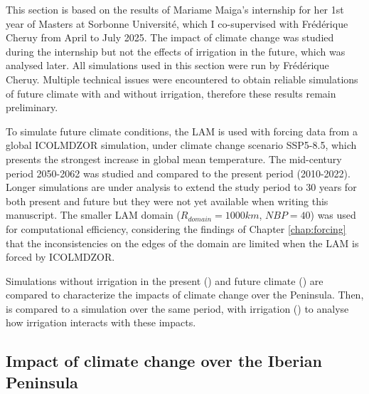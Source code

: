 This section is based on the results of Mariame Maiga's internship for her 1st year of Masters at Sorbonne Université, which I co-supervised with Frédérique Cheruy from April to July 2025. The impact of climate change was studied during the internship but not the effects of irrigation in the future, which was analysed later. All simulations used in this section were run by Frédérique Cheruy. 
Multiple technical issues were encountered to obtain reliable simulations of future climate with and without irrigation, therefore these results remain preliminary.

\hfill

To simulate future climate conditions, the LAM is used with forcing data from a global ICOLMDZOR simulation, under climate change scenario SSP5-8.5, which presents the strongest increase in global mean temperature. The mid-century period 2050-2062 was studied and compared to the present period (2010-2022). Longer simulations are under analysis to extend the study period to 30 years for both present and future but they were not yet available when writing this manuscript.
The smaller LAM domain ($R_{domain} = 1000 km$, $NBP=40$) was used for computational efficiency, considering the findings of Chapter \ref{chap:forcing} that the inconsistencies on the edges of the domain are limited when the LAM is forced by ICOLMDZOR.

Simulations without irrigation in the present (\presnoirr) and future climate (\futnoirr) are compared to characterize the impacts of climate change over the Peninsula. Then, \futnoirr is compared to a simulation over the same period, with irrigation (\futirr) to analyse how irrigation interacts with these impacts.

\subsection{Impact of climate change over the Iberian Peninsula}

